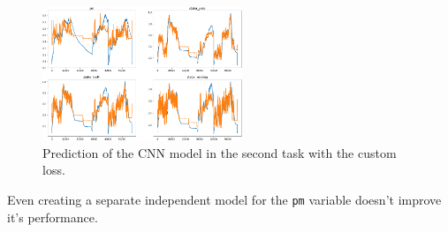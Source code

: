 \begin{figure}[!h]
    \centering
    \includegraphics[width=\linewidth, height=4cm]{imgs/pred_second_custom_loss.png}
    \caption{Prediction of the CNN model in the second task with the custom loss.}
    \label{fig:cnn_second}
\end{figure}

Even creating a separate independent model for the \verb|pm| variable doesn't improve it's performance.



